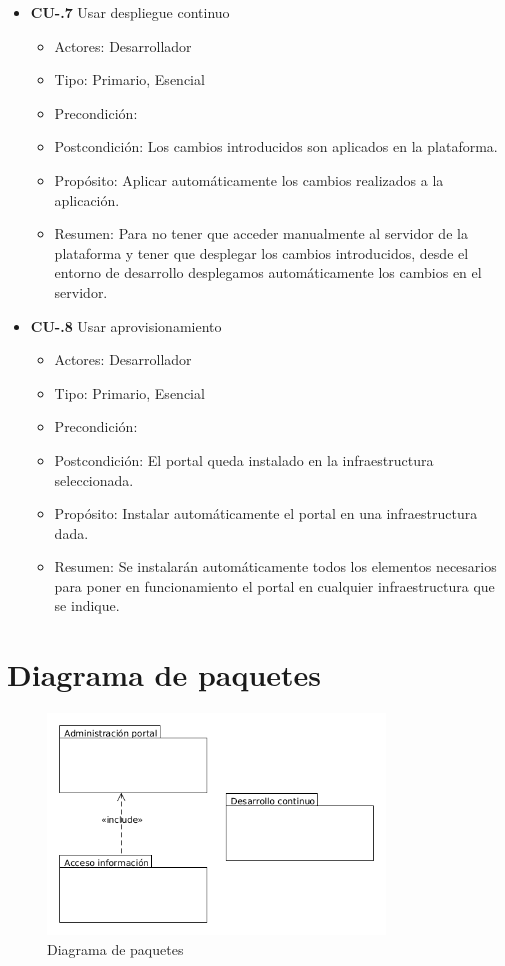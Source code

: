 \begin{itemize}
  \item \textbf{CU-.7 } Usar despliegue continuo
  \begin{itemize}
    \item Actores: Desarrollador
    \item Tipo: Primario, Esencial
    \item Precondición: 
    \item Postcondición: Los cambios introducidos son aplicados en la plataforma.
    \item Propósito: Aplicar automáticamente los cambios realizados a la aplicación. 
    \item Resumen: Para no tener que acceder manualmente al servidor de la plataforma y tener que desplegar los cambios 
    introducidos, desde el entorno de desarrollo desplegamos automáticamente los cambios en el servidor.
  \end{itemize}
 
  \item \textbf{CU-.8 } Usar aprovisionamiento
  \begin{itemize}
    \item Actores: Desarrollador
    \item Tipo: Primario, Esencial
    \item Precondición: 
    \item Postcondición: El portal queda instalado en la infraestructura seleccionada.
    \item Propósito: Instalar automáticamente el portal en una infraestructura dada.
    \item Resumen: Se instalarán automáticamente todos los elementos necesarios para poner en funcionamiento el portal en 
    cualquier infraestructura que se indique.
  \end{itemize}
 \end{itemize}

\newpage
\section{Diagrama de paquetes}

\begin{figure}[!h]
  \begin{center}
  \includegraphics[width=0.8\textwidth]{imagenes/diagrama_paquetes.png}
  \caption[diagrama_paquetes]{Diagrama de paquetes}
  \label{fig:diagrama_paquetes}
  \end{center}
\end{figure}
 
